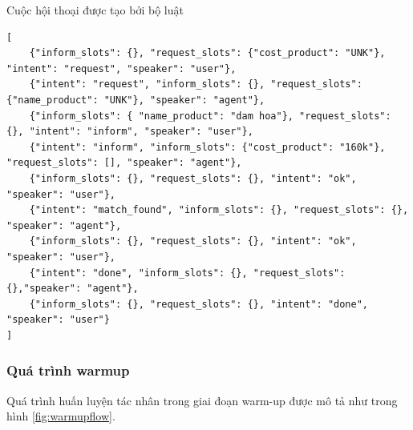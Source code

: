 \renewcommand{\textboxenvname}{Ví dụ}
\begin{textbox}{Cuộc hội thoại được tạo bởi bộ luật}
\begin{Verbatim}[breaklines=true, breakanywhere=true]
[
    {"inform_slots": {}, "request_slots": {"cost_product": "UNK"}, "intent": "request", "speaker": "user"},
    {"intent": "request", "inform_slots": {}, "request_slots": {"name_product": "UNK"}, "speaker": "agent"},
    {"inform_slots": { "name_product": "dam hoa"}, "request_slots": {}, "intent": "inform", "speaker": "user"},
    {"intent": "inform", "inform_slots": {"cost_product": "160k"}, "request_slots": [], "speaker": "agent"},
    {"inform_slots": {}, "request_slots": {}, "intent": "ok", "speaker": "user"},
    {"intent": "match_found", "inform_slots": {}, "request_slots": {}, "speaker": "agent"},
    {"inform_slots": {}, "request_slots": {}, "intent": "ok", "speaker": "user"},
    {"intent": "done", "inform_slots": {}, "request_slots": {},"speaker": "agent"},
    {"inform_slots": {}, "request_slots": {}, "intent": "done", "speaker": "user"}
]
\end{Verbatim}
\end{textbox}

\subsubsection{Quá trình warmup}
Quá trình huấn luyện tác nhân trong giai đoạn warm-up được mô tả như
trong hình \ref{fig:warmupflow}.

